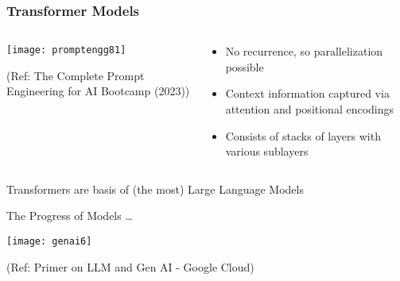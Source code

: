 \begin{frame}[fragile]\frametitle{Transformer Models}

\begin{columns}
    \begin{column}[T]{0.7\linewidth}
		\begin{center}
		\texttt{[image: promptengg81]}

		{\tiny (Ref: The Complete Prompt Engineering for AI Bootcamp (2023))}
		\end{center}	
    \end{column}
    \begin{column}[T]{0.3\linewidth}
		\begin{itemize}
		\item  No recurrence, so parallelization possible
		\item  Context information captured via attention and positional encodings
		\item Consists of stacks of layers with various sublayers
		\end{itemize}
    \end{column}
  \end{columns}
  
Transformers are basis of (the most) Large Language Models


\end{frame}


\begin{frame}[fragile]{The Progress of Models \ldots}

\begin{center}
\texttt{[image: genai6]}
\end{center}

{\tiny (Ref: Primer on LLM and Gen AI - Google Cloud)}
  
\end{frame}

	
